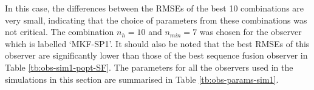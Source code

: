 

In this case, the differences between the RMSEs of the best 10 combinations are very small, indicating that the choice of parameters from these combinations was not critical. The combination $n_h=10$ and $n_{min}=7$ was chosen for the observer which is labelled `MKF-SP1'. It should also be noted that the best RMSEs of this observer are significantly lower than those of the best sequence fusion observer in Table \ref{tb:obs-sim1-popt-SF}. The parameters for all the observers used in the simulations in this section are summarised in Table \ref{tb:obs-params-sim1}.

